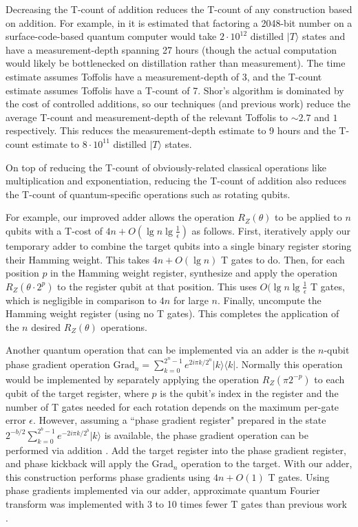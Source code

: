 \documentclass[twocolumn]{quantumarticle-customized}
\begin{document}
Decreasing the T-count of addition reduces the T-count of any construction based on addition.
For example, in \cite{Fowler2012} it is estimated that factoring a 2048-bit number on a surface-code-based quantum computer would take $2 \cdot 10^{12}$ distilled $|T\rangle$ states and have a measurement-depth spanning 27 hours (though the actual computation would likely be bottlenecked on distillation rather than measurement).
The time estimate assumes Toffolis have a measurement-depth of 3, and the T-count estimate assumes Toffolis have a T-count of 7.
Shor's algorithm is dominated by the cost of controlled additions, so our techniques (and previous work) reduce the average T-count and measurement-depth of the relevant Toffolis to $\sim 2.7$ and $1$ respectively.
This reduces the measurement-depth estimate to 9 hours and the T-count estimate to $8 \cdot 10^{11}$ distilled $|T\rangle$ states.

On top of reducing the T-count of obviously-related classical operations like multiplication and exponentiation, reducing the T-count of addition also reduces the T-count of quantum-specific operations such as rotating qubits.

For example, our improved adder allows the operation $R_Z(\theta)$ to be applied to $n$ qubits with a T-cost of $4n + O(\lg n \lg \frac{1}{\epsilon})$ as follows.
First, iteratively apply our temporary adder to combine the target qubits into a single binary register storing their Hamming weight.
This takes $4n + O(\lg n)$ T gates to do.
Then, for each position $p$ in the Hamming weight register, synthesize and apply the operation $R_Z(\theta \cdot 2^p)$ to the register qubit at that position.
This uses $O(\lg n \lg \frac{1}{\epsilon}$ T gates, which is negligible in comparison to $4n$ for large $n$.
Finally, uncompute the Hamming weight register (using no T gates).
This completes the application of the $n$ desired $R_Z(\theta)$ operations.

Another quantum operation that can be implemented via an adder is the $n$-qubit phase gradient operation $\text{Grad}_n = \sum_{k=0}^{2^n-1} e^{2 i \pi k / 2^n} |k\rangle \langle k|$.
Normally this operation would be implemented by separately applying the operation $R_Z(\pi 2^{-p})$ to each qubit of the target register, where $p$ is the qubit's index in the register and the number of T gates needed for each rotation depends on the maximum per-gate error $\epsilon$.
However, assuming a ``phase gradient register" prepared in the state $2^{-b/2} \sum_{k=0}^{2^b-1} e^{-2 i \pi k / 2^b} |k\rangle$ is available, the phase gradient operation can be performed via addition \cite{Kitaev2002}.
Add the target register into the phase gradient register, and phase kickback will apply the $\text{Grad}_n$ operation to the target.
With our adder, this construction performs phase gradients using $4n + O(1)$ T gates.
Using phase gradients implemented via our adder, approximate quantum Fourier transform was implemented with 3 to 10 times fewer T gates than previous work \cite{Nam2018}.
\end{document}
